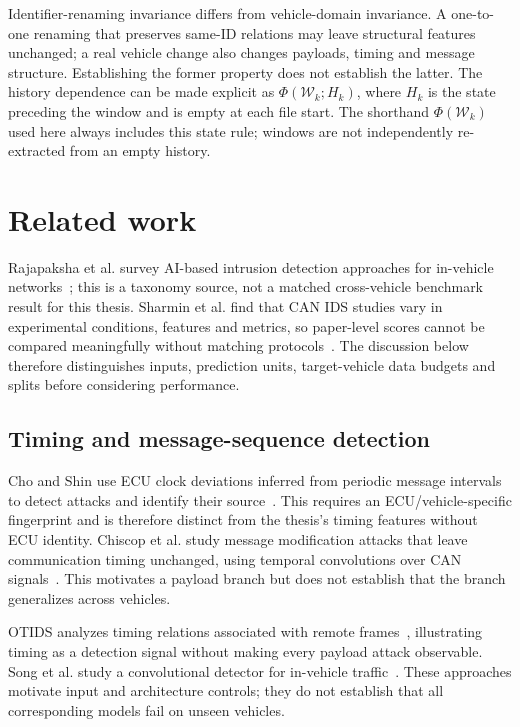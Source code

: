 \documentclass[12pt,a4paper,oneside,openany]{extbook}
\begin{document}
Identifier-renaming invariance differs from vehicle-domain invariance. A one-to-one renaming that preserves same-ID relations may leave structural features unchanged; a real vehicle change also changes payloads, timing and message structure. Establishing the former property does not establish the latter.
The history dependence can be made explicit as $\Phi(\mathcal W_k;H_k)$, where $H_k$ is the state preceding the window and is empty at each file start. The shorthand $\Phi(\mathcal W_k)$ used here always includes this state rule; windows are not independently re-extracted from an empty history.


\chapter{Related work}\label{chap:related}
Rajapaksha et al. survey AI-based intrusion detection approaches for in-vehicle networks~\cite{rajapaksha2023survey}; this is a taxonomy source, not a matched cross-vehicle benchmark result for this thesis. Sharmin et al. find that CAN IDS studies vary in experimental conditions, features and metrics, so paper-level scores cannot be compared meaningfully without matching protocols~\cite{sharmin2024benchmark}. The discussion below therefore distinguishes inputs, prediction units, target-vehicle data budgets and splits before considering performance.

\section{Timing and message-sequence detection}
Cho and Shin use ECU clock deviations inferred from periodic message intervals to detect attacks and identify their source~\cite{cho2016fingerprint}. This requires an ECU/vehicle-specific fingerprint and is therefore distinct from the thesis's timing features without ECU identity. Chiscop et al. study message modification attacks that leave communication timing unchanged, using temporal convolutions over CAN signals~\cite{chiscop2021modification}. This motivates a payload branch but does not establish that the branch generalizes across vehicles.

OTIDS analyzes timing relations associated with remote frames~\cite{lee2017otids}, illustrating timing as a detection signal without making every payload attack observable. Song et al. study a convolutional detector for in-vehicle traffic~\cite{song2020dcnn}. These approaches motivate input and architecture controls; they do not establish that all corresponding models fail on unseen vehicles.
\end{document}
